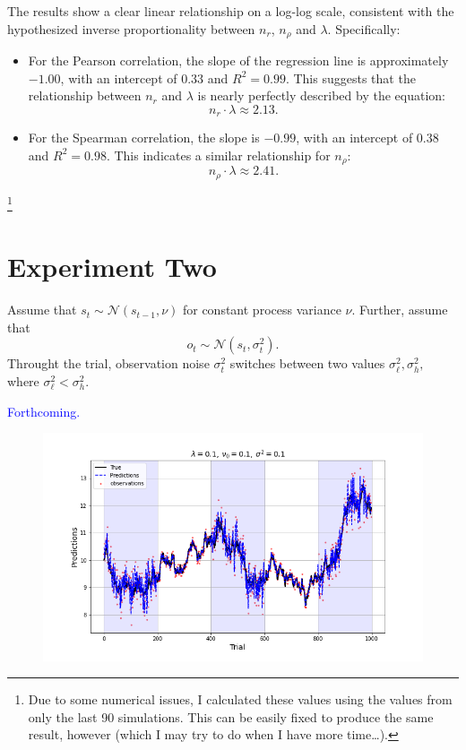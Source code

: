 \documentclass[12pt]{article}
\theoremstyle{definition}
\begin{document}
The results show a clear linear relationship on a log-log scale, consistent with the hypothesized inverse proportionality between $n_r$, $n_\rho$ and $\lambda$.
Specifically:
\begin{itemize}
    \item For the Pearson correlation, the slope of the regression line is approximately $-1.00$, with an intercept of $0.33$ and $R^2 = 0.99$. This suggests that the relationship between $n_r$ and $\lambda$ is nearly perfectly described by the equation:
    $$
    n_r \cdot \lambda \approx 2.13.
    $$
    \item For the Spearman correlation, the slope is $-0.99$, with an intercept of $0.38$ and $R^2 = 0.98$. This indicates a similar relationship for $n_\rho$:
    $$
    n_\rho \cdot \lambda \approx 2.41.
    $$
\end{itemize}
\footnote{Due to some numerical issues, I calculated these values using the values from only the last 90 simulations. This can be easily fixed to produce the same result, however (which I may try to do when I have more time\dots).}
\newpage 

\section*{Experiment Two}

Assume that $s_t \sim \mathcal{N}(s_{t-1},\nu)$ for constant process variance $\nu$. Further, assume that 
$$o_t \sim \mathcal{N}(s_t, \sigma_t^2).$$
Throught the trial, observation noise $\sigma_t^2$ switches between two values $\sigma_\ell^2, \sigma_h^2,$ where $\sigma_\ell^2 < \sigma_h^2$.

\textcolor{blue}{Forthcoming.} 

\begin{figure}[H]
    \centering
    \includegraphics[scale=0.5]{../Figures/exp2_walk.png}
\end{figure}
\end{document}

